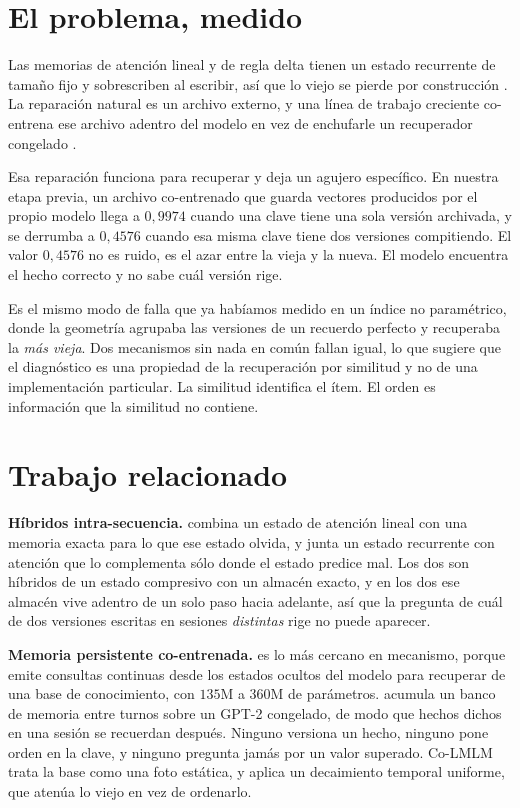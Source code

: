 \documentclass[11pt,a4paper]{article}
\begin{document}
\section{El problema, medido}

Las memorias de atención lineal y de regla delta tienen un estado recurrente de tamaño fijo y
sobrescriben al escribir, así que lo viejo se pierde por construcción \citep{deltanet,gateddeltanet}.
La reparación natural es un archivo externo, y una línea de trabajo creciente co-entrena ese archivo
adentro del modelo en vez de enchufarle un recuperador congelado \citep{colmlm,persistmem,lmlm}.

Esa reparación funciona para recuperar y deja un agujero específico. En nuestra etapa previa, un
archivo co-entrenado que guarda vectores producidos por el propio modelo llega a $0{,}9974$ cuando una
clave tiene una sola versión archivada, y se derrumba a $0{,}4576$ cuando esa misma clave tiene dos
versiones compitiendo. El valor $0{,}4576$ no es ruido, es el azar entre la vieja y la nueva. El
modelo encuentra el hecho correcto y no sabe cuál versión rige.

Es el mismo modo de falla que ya habíamos medido en un índice no paramétrico, donde la geometría
agrupaba las versiones de un recuerdo perfecto y recuperaba la \emph{más vieja}. Dos mecanismos sin
nada en común fallan igual, lo que sugiere que el diagnóstico es una propiedad de la recuperación por
similitud y no de una implementación particular. La similitud identifica el ítem. El orden es
información que la similitud no contiene.

\section{Trabajo relacionado}

\textbf{Híbridos intra-secuencia.} \citet{hola} combina un estado de atención lineal con una memoria
exacta para lo que ese estado olvida, y \citet{ham} junta un estado recurrente con atención que lo
complementa sólo donde el estado predice mal. Los dos son híbridos de un estado compresivo con un
almacén exacto, y en los dos ese almacén vive adentro de un solo paso hacia adelante, así que la
pregunta de cuál de dos versiones escritas en sesiones \emph{distintas} rige no puede aparecer.

\textbf{Memoria persistente co-entrenada.} \citet{colmlm} es lo más cercano en mecanismo, porque emite
consultas continuas desde los estados ocultos del modelo para recuperar de una base de conocimiento,
con $135$M a $360$M de parámetros. \citet{persistmem} acumula un banco de memoria entre turnos sobre
un GPT-2 congelado, de modo que hechos dichos en una sesión se recuerdan después. Ninguno versiona un
hecho, ninguno pone orden en la clave, y ninguno pregunta jamás por un valor superado. Co-LMLM trata
la base como una foto estática, y \citet{persistmem} aplica un decaimiento temporal uniforme, que
atenúa lo viejo en vez de ordenarlo.
\end{document}
